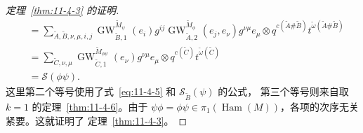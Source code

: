 \begin{proof}[定理~\ref{thm:11-4-3} 的证明]
\[\begin{aligned}
  &={}
  \sum_{\widetilde A,\widetilde B,\nu,\mu,i,j}
  \operatorname{GW}^{\widetilde M_\psi}_{\widetilde B,1}(e_i)g^{ij}
  \operatorname{GW}^{\widetilde M_\phi}_{\widetilde A,2}(e_j,e_\nu)g^{\nu\mu}e_\mu
  \otimes q^{c(\widetilde A\#\widetilde B)}
  t^{\widetilde\omega(\widetilde A\#\widetilde B)}\\
  &={}
  \sum_{\widetilde C,\nu,\mu}
  \operatorname{GW}^{\widetilde M_{\phi\psi}}_{\widetilde C,1}(e_\nu)
  g^{\nu\mu}e_\mu\otimes
  q^{c(\widetilde C)}t^{\widetilde\omega(\widetilde C)}\\
  &=\mathcal S(\phi\psi).
\end{aligned}
\]
这里第二个等号使用了式~\eqref{eq:11-4-5} 和 $\mathcal S_{\widetilde B}(\psi)$ 的公式，
第三个等号则来自取 $k=1$ 的定理~\ref{thm:11-4-6}。由于
$\psi\phi=\phi\psi\in\pi_1(\operatorname{Ham}(M))$，各项的次序无关紧要。这就证明了
定理~\ref{thm:11-4-3}。
\end{proof}

